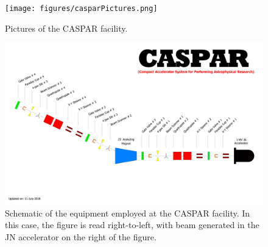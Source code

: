 \begin{figure}
\centering
\texttt{[image: figures/casparPictures.png]}
\caption{Pictures of the CASPAR facility. }
\label{fig: casparPictures}
\end{figure}



\begin{figure}
\centering
\includegraphics[width=\linewidth]{figures/casparSchematic.pdf}
\caption{Schematic of the equipment employed at the CASPAR facility. In this case, the figure is read right-to-left, with beam generated in the JN accelerator on the right of the figure. }
\label{fig: casparSchematic}
\end{figure}



